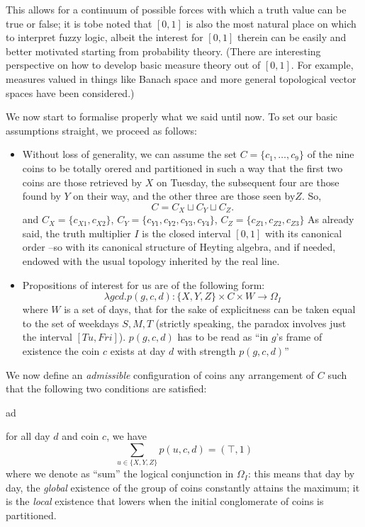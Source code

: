 \begin{example}
\begin{remark}
		This allows for a continuum of possible forces with which a truth value can be true or false;  it is tobe noted that $[0,1]$ is also the most natural place on which to interpret fuzzy logic, albeit the interest for $[0,1]$ therein can be easily and better motivated starting from probability theory. (There are interesting perspective on how to develop basic measure theory out of $[0,1]$. For example, measures valued in things like Banach space and more general topological	vector spaces have been considered.)
	\end{remark}
	We now start to formalise properly what we said until now. To set our basic assumptions straight, we proceed as follows:
	\begin{itemize}
		\item Without loss of generality, we can assume the set $C = \{c_1,\dots,c_9\}$ of the nine coins to be totally orered and partitioned in such a way that the first two coins are those retrieved by $X$ on Tuesday, the subsequent four are those found by $Y$ on their way, and the other three are those seen by$Z$. So,
		      \[C = C_X \sqcup C_Y \sqcup C_Z.\]
		      and $C_X = \{c_{X1}, c_{X2}\}$, $C_Y = \{c_{Y1},c_{Y2},c_{Y3},c_{Y4}\}$, $C_Z= \{c_{Z1}, c_{Z2}, c_{Z3}\}$ As already said, the truth multiplier $I$ is the closed interval $[0,1]$ with its canonical order --so with its canonical structure of Heyting algebra, and if needed, endowed with the usual topology inherited by the real line.
		\item Propositions of interest for us are of the following form:
		      \[\lambda gcd.p(g, c, d) : \{X,Y,Z\}\times C\times W \to \Omega_I\]
		      where $W$ is a set of days, that for the sake of explicitness can be taken equal to the set of weekdays $S,M,T$ (strictly speaking, the paradox involves just the interval $[Tu,Fri]$). $p(g,c,d)$ has to be read as ``in $g$'s frame of existence the coin $c$ exists at day $d$ with strength $p(g,c,d)$''
	\end{itemize}
	\begin{definition}
		We now define an \emph{admissible} configuration of coins any arrangement of $C$ such that the following two conditions are satisfied:
		\begin{enumtag}{ad}
			\item for all day $d$ and coin $c$, we have
			\[
				\sum_{u\in \{X,Y,Z\}} p(u,c,d) = (\top, 1)
			\]
			where we denote as ``sum'' the logical conjunction in $\Omega_I$: this means that day by day, the \emph{global} existence of the group of coins constantly attains the maximum; it is the \emph{local} existence that lowers when the initial conglomerate of coins is partitioned.

\end{enumtag}
\end{definition}
\end{example}

